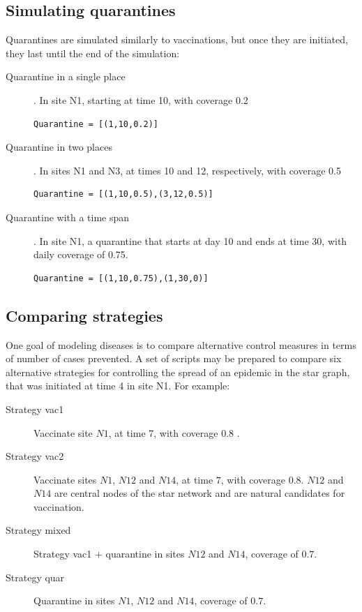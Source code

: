 \subsection{Simulating quarantines}
Quarantines are simulated similarly to vaccinations, but once they are initiated, they last until the end of the simulation:
\begin{description}
\item[Quarantine in a single place].  In site N1, starting at time 10, with coverage 0.2
\begin{verbatim}
Quarantine = [(1,10,0.2)]
\end{verbatim}
\item[Quarantine in two places].  In sites N1 and N3, at times 10 and 12, respectively, with coverage 0.5
\begin{verbatim}
Quarantine = [(1,10,0.5),(3,12,0.5)]
\end{verbatim}
\item[Quarantine with a time span].  In site N1, a quarantine that starts at day 10 and ends at time 30, with daily coverage of 0.75.
\begin{verbatim}
Quarantine = [(1,10,0.75),(1,30,0)]
\end{verbatim}
\end{description}

\subsection{Comparing strategies}
One goal of modeling diseases is to compare alternative control measures in terms of number of cases prevented. A set of scripts may be prepared to compare six alternative strategies for controlling the spread of an epidemic in the star graph, that was initiated at time 4 in site N1. For example:
\begin{description}
\item[Strategy vac1]  Vaccinate site $N1$, at time $7$, with coverage $0.8$ .
\item[Strategy vac2]  Vaccinate sites $N1$, $N12$ and $N14$, at time $7$, with coverage $0.8$. $N12$ and $N14$ are central nodes of the star network and are natural candidates for vaccination.
\item[Strategy mixed] Strategy vac1 $+$ quarantine in sites $N12$ and $N14$, coverage of $0.7$.
\item[Strategy quar] Quarantine in sites $N1$, $N12$ and $N14$, coverage of $0.7$.
\end{description}


